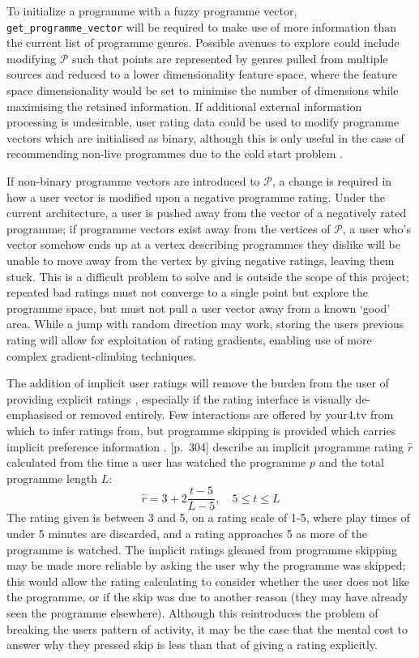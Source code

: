 		To initialize a programme with a fuzzy programme vector, \texttt{get\_programme\_vector} will be required to make use of more information than the current list of programme genres. Possible avenues to explore could include modifying $\mathcal{P}$ such that points are represented by genres pulled from multiple sources and reduced to a lower dimensionality feature space, where the feature space dimensionality would be set to minimise the number of dimensions while maximising the retained information. If additional external information processing is undesirable, user rating data could be used to modify programme vectors which are initialised as binary, although this is only useful in the case of recommending non-live programmes due to the cold start problem \citep{cold-start-problem}.

		If non-binary programme vectors are introduced to $\mathcal{P}$, a change is required in how a user vector is modified upon a negative programme rating. Under the current architecture, a user is pushed away from the vector of a negatively rated programme; if programme vectors exist away from the vertices of $\mathcal{P}$, a user who's vector somehow ends up at a vertex describing programmes they dislike will be unable to move away from the vertex by giving negative ratings, leaving them stuck. This is a difficult problem to solve and is outside the scope of this project; repeated bad ratings must not converge to a single point but explore the programme space, but must not pull a user vector away from a known `good' area. While a jump with random direction may work, storing the users previous rating will allow for exploitation of rating gradients, enabling use of more complex gradient-climbing techniques.

		The addition of implicit user ratings will remove the burden from the user of providing explicit ratings \citep{implicit_indicators}, especially if the rating interface is visually de-emphasised or removed entirely. Few interactions are offered by your4.tv from which to infer ratings from, but programme skipping is provided which carries implicit preference information \cite{exploiting_implicit_feedback}. \citep{recommender-systems-handbook}[p.~304] describe an implicit programme rating $\hat{r}$ calculated from the time a user has watched the programme $p$ and the total programme length $L$:
		$$
			\hat{r} = 3 + 2 \frac{t - 5}{L - 5},\quad 5 \leq t \leq L
		$$
		The rating given is between 3 and 5, on a rating scale of 1-5, where play times of under 5 minutes are discarded, and a rating approaches 5 as more of the programme is watched. The implicit ratings gleaned from programme skipping may be made more reliable by asking the user why the programme was skipped; this would allow the rating calculating to consider whether the user does not like the programme, or if the skip was due to another reason (they may have already seen the programme elsewhere). Although this reintroduces the problem of breaking the users pattern of activity, it may be the case that the mental cost to answer why they pressed skip is less than that of giving a rating explicitly.

